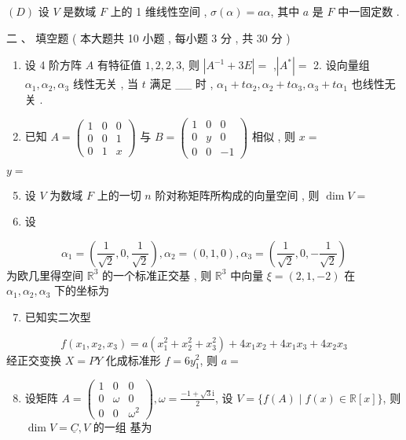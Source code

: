 \documentclass[10pt]{article}
\begin{document}
{$(D)$  设  $V$  是数域  $F$  上的  1  维线性空间 , $\sigma(\alpha)=a \alpha$,  其中  $a$  是  $F$  中一固定数 .

 二 、 填空题 ( 本大题共  10  小题 ,  每小题  3  分 ,  共  30  分 )

\begin{enumerate}
  \item  设  4  阶方阵  $A$  有特征值  $1,2,2,3$,  则  $\left|A^{-1}+3 E\right|=$ ,$\left|A^{*}\right|=$ 2.  设向量组  $\alpha_{1}, \alpha_{2}, \alpha_{3}$  线性无关 ,  当  $t$  满足  \_\_ 时 , $\alpha_{1}+t \alpha_{2}, \alpha_{2}+t \alpha_{3}, \alpha_{3}+t \alpha_{1}$  也线性无关 .

  \item  已知  $A=\left(\begin{array}{ccc}1 & 0 & 0 \\ 0 & 0 & 1 \\ 0 & 1 & x\end{array}\right)$  与  $B=\left(\begin{array}{ccc}1 & 0 & 0 \\ 0 & y & 0 \\ 0 & 0 & -1\end{array}\right)$  相似 ,  则  $x=$

\end{enumerate}
$y=$

\begin{enumerate}
  \setcounter{enumi}{4}
  \item  设  $V$  为数域  $F$  上的一切  $n$  阶对称矩阵所构成的向量空间 ,  则  $\operatorname{dim} V=$

  \item  设 

\end{enumerate}
$$
\alpha_{1}=\left(\frac{1}{\sqrt{2}}, 0, \frac{1}{\sqrt{2}}\right), \alpha_{2}=(0,1,0), \alpha_{3}=\left(\frac{1}{\sqrt{2}}, 0,-\frac{1}{\sqrt{2}}\right)
$$
 为欧几里得空间  $\mathbb{R}^{3}$  的一个标准正交基 ,  则  $\mathbb{R}^{3}$  中向量  $\xi=(2,1,-2)$  在  $\alpha_{1}, \alpha_{2}, \alpha_{3}$  下的坐标为 

\begin{enumerate}
  \setcounter{enumi}{6}
  \item  已知实二次型 
\end{enumerate}
$$
f\left(x_{1}, x_{2}, x_{3}\right)=a\left(x_{1}^{2}+x_{2}^{2}+x_{3}^{2}\right)+4 x_{1} x_{2}+4 x_{1} x_{3}+4 x_{2} x_{3}
$$
 经正交变换  $X=P Y$  化成标准形  $f=6 y_{1}^{2}$,  则  $a=$

\begin{enumerate}
  \setcounter{enumi}{7}
  \item  设矩阵  $A=\left(\begin{array}{ccc}1 & 0 & 0 \\ 0 & \omega & 0 \\ 0 & 0 & \omega^{2}\end{array}\right), \omega=\frac{-1+\sqrt{3} \mathrm{i}}{2}$,  设  $V=\{f(A) \mid f(x) \in \mathbb{R}[x]\}$,  则  $\operatorname{dim} V=\underline{C}, V$  的一组   基为 


\end{enumerate}}
\end{document}
